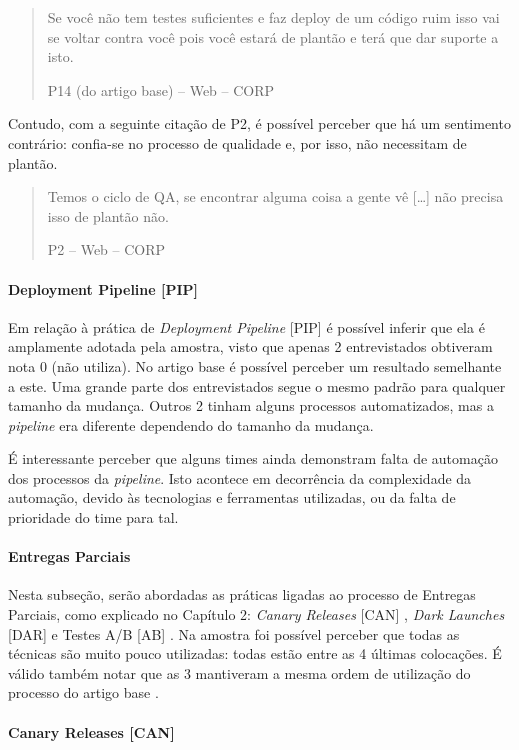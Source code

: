 \blockquote[P14 (do artigo base) -- Web -- CORP]{Se você não tem testes suficientes e faz deploy de um código ruim isso vai se voltar contra você pois você estará de plantão e terá que dar suporte a isto.}

Contudo, com a seguinte citação de P2, é possível perceber que há um sentimento contrário: confia-se no processo de qualidade e, por isso, não necessitam de plantão.


\blockquote[P2 -- Web -- CORP]{Temos o ciclo de QA, se encontrar alguma coisa a gente vê […] não precisa isso de plantão não.}

\paragraph{Deployment Pipeline [PIP]}

Em relação à prática de \emph{Deployment Pipeline} [PIP] é possível inferir que ela é amplamente adotada pela amostra, visto que apenas 2 entrevistados obtiveram nota 0 (não utiliza). No artigo base é possível perceber um resultado semelhante a este. Uma grande parte dos entrevistados segue o mesmo padrão para qualquer tamanho da mudança. Outros 2 tinham alguns processos automatizados, mas a \emph{pipeline} era diferente dependendo do tamanho da mudança.

É interessante perceber que alguns times ainda demonstram falta de automação dos processos da \emph{pipeline}. Isto acontece em decorrência da complexidade da automação, devido às tecnologias e ferramentas utilizadas, ou da falta de prioridade do time para tal.
 
\paragraph{Entregas Parciais}

Nesta subseção, serão abordadas as práticas ligadas ao processo de Entregas Parciais, como explicado no Capítulo 2: \emph{Canary Releases} [CAN] \cite{continuousDeliveryBook}, \emph{Dark Launches} [DAR] \cite{devAndDeploymentFB} e Testes A/B [AB] \cite{testsAB}. Na amostra foi possível perceber que todas as técnicas são muito pouco utilizadas: todas estão entre as 4 últimas colocações. É válido também notar que as 3 mantiveram a mesma ordem de utilização do processo do artigo base \cite{empiricalStudy2016}.

\paragraph{Canary Releases [CAN]}


